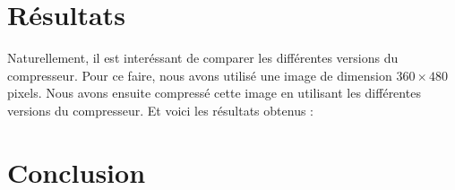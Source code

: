 \documentclass[utf8]{article}
\begin{document}
\section{Résultats}
Naturellement, il est interéssant de comparer les différentes versions du compresseur. Pour ce faire, nous avons utilisé une image de dimension $360 \times 480$ pixels. Nous avons ensuite compressé cette image en utilisant les différentes versions du compresseur. Et voici les résultats obtenus : 


\section{Conclusion}
\end{document}
